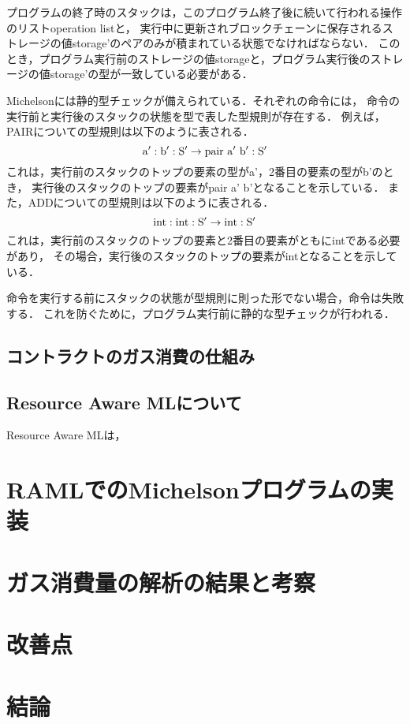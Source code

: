 \documentclass{kuisthesis}
\begin{document}
プログラムの終了時のスタックは，このプログラム終了後に続いて行われる操作のリストoperation listと，
実行中に更新されブロックチェーンに保存されるストレージの値storage'のペアのみが積まれている状態でなければならない．
このとき，プログラム実行前のストレージの値storageと，プログラム実行後のストレージの値storage'の型が一致している必要がある．

Michelsonには静的型チェックが備えられている．それぞれの命令には，
命令の実行前と実行後のスタックの状態を型で表した型規則が存在する．
例えば，PAIRについての型規則は以下のように表される．
\begin{displaymath}
  {\rm a' : b' : S'} \rightarrow {\rm pair\ a'\ b' : S'}
\end{displaymath}
これは，実行前のスタックのトップの要素の型がa'，2番目の要素の型がb'のとき，
実行後のスタックのトップの要素がpair a' b'となることを示している．
また，ADDについての型規則は以下のように表される．
\begin{displaymath}
  {\rm int : int : S'} \rightarrow {\rm int : S'}
\end{displaymath}
これは，実行前のスタックのトップの要素と2番目の要素がともにintである必要があり，
その場合，実行後のスタックのトップの要素がintとなることを示している．

命令を実行する前にスタックの状態が型規則に則った形でない場合，命令は失敗する．
これを防ぐために，プログラム実行前に静的な型チェックが行われる．

\subsection{コントラクトのガス消費の仕組み}\label{subsec-pre-gas}

\subsection{Resource Aware MLについて}\label{subsec-pre-raml}
Resource Aware MLは，

\section{RAMLでのMichelsonプログラムの実装}

\section{ガス消費量の解析の結果と考察}

\section{改善点}

\section{結論}\label{sec-conclusion}

\acknowledgments

\nocite{*}


\end{document}
